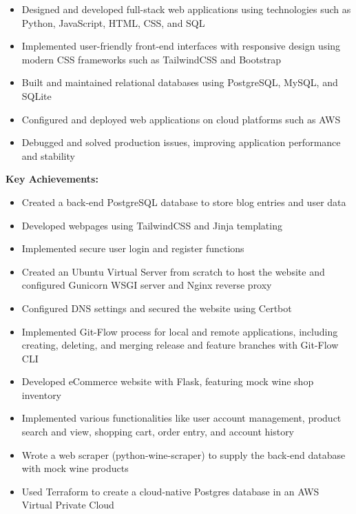 \documentclass[
    10pt,
    A4,
    english,
    draft = false,
    twoside = false,
]{article}
\begin{document}
    {
    \begin{itemize}
      \item Designed and developed full-stack web applications using technologies such as Python,           JavaScript, HTML, CSS, and SQL
      \item Implemented user-friendly front-end interfaces with responsive design using modern CSS          frameworks such as TailwindCSS and Bootstrap
      \item Built and maintained relational databases using PostgreSQL, MySQL, and SQLite
      \item Configured and deployed web applications on cloud platforms such as AWS
      \item Debugged and solved production issues, improving application performance and stability
   \end{itemize}
   \begin{description}
   \textcolor{light-bluey}
    {\-\hspace{-.45cm}\textbf {Key Achievements:}}
   \end{description}
   \begin{itemize}
      \item Created a back-end PostgreSQL database to store blog entries and user data
      \item Developed webpages using TailwindCSS and Jinja templating
      \item Implemented secure user login and register functions
      \item Created an Ubuntu Virtual Server from scratch to host the website and configured Gunicorn WSGI server and Nginx reverse proxy
      \item Configured DNS settings and secured the website using Certbot
      \item Implemented Git-Flow process for local and remote applications, including creating, deleting, and merging release and feature branches with Git-Flow CLI
      \item Developed eCommerce website with Flask, featuring mock wine shop inventory
      \item Implemented various functionalities like user account management, product search and view, shopping cart, order entry, and account history
      \item  Wrote a web scraper (python-wine-scraper) to supply the back-end database with mock wine products
      \item Used Terraform to create a cloud-native Postgres database in an AWS Virtual Private Cloud
    \end{itemize}
    }
\end{document}
